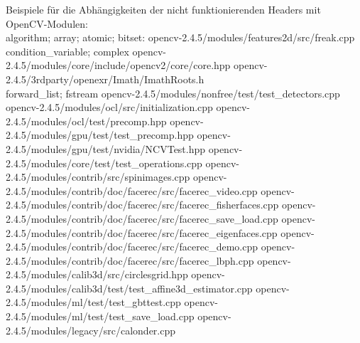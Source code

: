 \documentclass[10pt,a4paper]{article}
\begin{document}
Beispiele für die Abhängigkeiten der nicht funktionierenden Headers mit OpenCV-Modulen: \\

algorithm; array; atomic; bitset: \newline
opencv-2.4.5/modules/features2d/src/freak.cpp \\

condition\_variable; complex \newline
opencv-2.4.5/modules/core/include/opencv2/core/core.hpp \newline
opencv-2.4.5/3rdparty/openexr/Imath/ImathRoots.h \\

forward\_list; fstream \newline
opencv-2.4.5/modules/nonfree/test/test\_detectors.cpp \newline
opencv-2.4.5/modules/ocl/src/initialization.cpp \newline
opencv-2.4.5/modules/ocl/test/precomp.hpp \newline
opencv-2.4.5/modules/gpu/test/test\_precomp.hpp \newline
opencv-2.4.5/modules/gpu/test/nvidia/NCVTest.hpp \newline
opencv-2.4.5/modules/core/test/test\_operations.cpp \newline
opencv-2.4.5/modules/contrib/src/spinimages.cpp \newline
opencv-2.4.5/modules/contrib/doc/facerec/src/facerec\_video.cpp \newline
opencv-2.4.5/modules/contrib/doc/facerec/src/facerec\_fisherfaces.cpp \newline
opencv-2.4.5/modules/contrib/doc/facerec/src/facerec\_save\_load.cpp \newline
opencv-2.4.5/modules/contrib/doc/facerec/src/facerec\_eigenfaces.cpp \newline
opencv-2.4.5/modules/contrib/doc/facerec/src/facerec\_demo.cpp \newline
opencv-2.4.5/modules/contrib/doc/facerec/src/facerec\_lbph.cpp \newline
opencv-2.4.5/modules/calib3d/src/circlesgrid.hpp \newline
opencv-2.4.5/modules/calib3d/test/test\_affine3d\_estimator.cpp \newline
opencv-2.4.5/modules/ml/test/test\_gbttest.cpp \newline
opencv-2.4.5/modules/ml/test/test\_save\_load.cpp \newline
opencv-2.4.5/modules/legacy/src/calonder.cpp \newline
\end{document}
